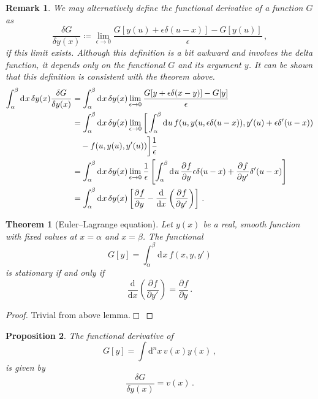 \documentclass{article}
\theoremstyle{plain}\theoremheaderfont{\normalfont\itshape}\theorembodyfont{\rmfamily}\theoremseparator{.}\newtheorem*{rem}{Remark}\newtheorem*{ex}{Example}\newtheorem*{proof}{Proof}\newtheorem*{altp}{Alternative proof}
\theoremstyle{plain}\theoremheaderfont{\normalfont\bfseries}\theorembodyfont{\rmfamily}\theoremseparator{.}\newtheorem{thm}{Theorem}[section]\newtheorem{lem}[thm]{Lemma}\newtheorem{prop}[thm]{Proposition}\newtheorem*{cor}{Corollary}\newtheorem{defn}[thm]{Definition}\newtheorem{clm}[thm]{Claim}\newtheorem{clminproof}{Claim}
\theoremstyle{break}\theoremheaderfont{\normalfont\itshape}\theorembodyfont{\rmfamily}\theoremseparator{.\medskip}\newtheorem*{proofskip}{Proof}\newtheorem*{exs}{Examples}\newtheorem*{rems}{Remarks}
\theoremstyle{break}\theoremheaderfont{\normalfont\bfseries}\theorembodyfont{\rmfamily}\theoremseparator{.\medskip}\newtheorem{lemskip}[thm]{Lemma}\newtheorem{defnskip}[thm]{Definition}\newtheorem{propskip}[thm]{Proposition}\newtheorem{thmskip}[thm]{Theorem}
\numberwithin{equation}{section}
\newcommand{\qed}{\hfill\ensuremath{\Box}}
\newcommand{\dd}[2][]{\mathrm{d}^{#1} #2\,}
\newcommand{\dv}[3][]{\frac{\mathrm{d}^{#1} #2}{{\mathrm{d} #3}^{#1}}}
\newcommand{\pdv}[3][]{\frac{\partial^{#1} #2}{{\partial #3}^{#1}}}
\begin{document}
    \begin{rem}
        We may alternatively define the functional derivative of a function \(G\) as
        \begin{equation}
            \frac{\delta G}{\delta y(x)}\coloneqq\lim_{\epsilon\to 0}\frac{G[y(u)+\epsilon\delta(u-x)]-G[y(u)]}{\epsilon}\,,
        \end{equation}
        if this limit exists. Although this definition is a bit awkward and involves the delta function, it depends only on the functional \(G\) and its argument \(y\). It can be shown that this definition is consistent with the theorem above.
        \begin{align}
            \int_{\alpha}^{\beta}\dd{x}\delta y(x) \frac{\delta G}{\delta y(x)}&=\int_{\alpha}^{\beta}\dd{x}\delta y(x)\lim_{\epsilon\to 0}\frac{G[y+\epsilon\delta(x-y)]-G[y]}{\epsilon}\notag\\
            &=\int_{\alpha}^{\beta}\dd{x}\delta y(x)\lim_{\epsilon\to 0}\bigg[\int_{\alpha}^{\beta}\dd{u}f(u,y(u,\epsilon\delta(u-x)),y'(u)+\epsilon\delta'(u-x)) \notag\\
            &\quad -f(u,y(u),y'(u))\bigg]\frac{1}{\epsilon}\notag\\
            &=\int_{\alpha}^{\beta}\dd{x}\delta y(x)\lim_{\epsilon\to 0}\frac{1}{\epsilon}\left[\int_{\alpha}^{\beta}\dd{u}\pdv{f}{y}\epsilon\delta(u-x)+\pdv{f}{y'}\delta'(u-x)\right]\notag\\
            &=\int_{\alpha}^{\beta}\dd{x}\delta y(x)\left[\pdv{f}{y}-\dv{}{x}\left(\pdv{f}{y'}\right)\right]\,.
        \end{align}
    \end{rem}
    \begin{thm}[Euler--Lagrange equation]
        Let \(y(x)\) be a real, smooth function with fixed values at \(x=\alpha\) and \(x=\beta\). The functional
		\begin{equation}
			G[y]=\int_{\alpha}^{\beta}\dd{x}f(x,y,y')
		\end{equation}
		is stationary if and only if
		\begin{equation}
            \dv{}{x}\left(\pdv{f}{y'}\right)=\pdv{f}{y}\,.
        \end{equation}
    \end{thm}
    \begin{proof}
        Trivial from above lemma.\qed
    \end{proof}
    \begin{prop}
        The functional derivative of
        \begin{equation}
            G[y]=\int\dd[n]{x}v(x)y(x)\,,
        \end{equation}
        is given by
        \begin{equation}
            \frac{\delta G}{\delta y(x)}=v(x)\,.
        \end{equation}
    \end{prop}
\end{document}
